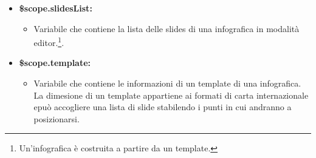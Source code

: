 \begin{itemize}
\begin{itemize}
	\end{itemize}
    \item \textbf{ \$scope.slidesList:}
	\begin{itemize}
	      \item Variabile che contiene la lista delle slides di una infografica in modalità editor.\footnote{Un'infografica è costruita a partire da un template.}.
	\end{itemize}
    \item \textbf{ \$scope.template:}
	\begin{itemize}
	      \item Variabile che contiene le informazioni di un template di una infografica. La dimesione di un template appartiene ai formati di carta internazionale  epuò accogliere una lista di slide stabilendo i punti in cui andranno a posizionarsi.
	\end{itemize}
\end{itemize}
